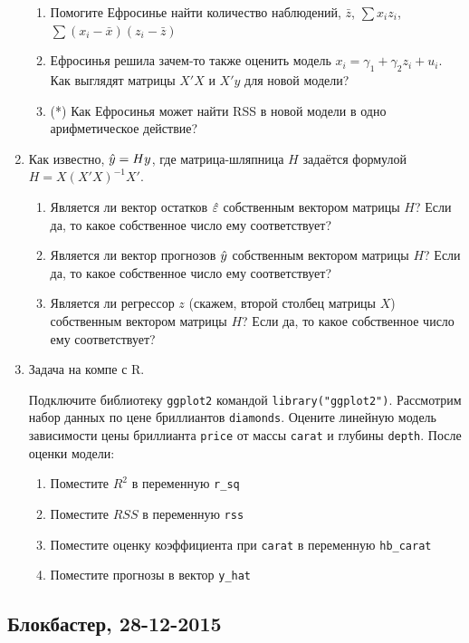 \documentclass[12pt, a4paper]{article}\usepackage[]{graphicx}\usepackage[]{color}
\begin{document}
\begin{enumerate}
\begin{enumerate}
\item Помогите Ефросинье найти количество наблюдений, $\bar{z}$, $\sum x_i z_i$, $\sum(x_i-\bar{x})(z_i-\bar{z})$
\item Ефросинья решила зачем-то также оценить модель $x_i = \gamma_1 + \gamma_2 z_i + u_i$. Как выглядят матрицы $X'X$ и $X'y$ для новой модели?
\item (*) Как Ефросинья может найти RSS в новой модели в одно арифметическое действие?
\end{enumerate}


\item Как известно, $\hat{y}=H y$, где матрица-шляпница $H$ задаётся формулой $H=X(X'X)^{-1}X'$.
\begin{enumerate}
\item Является ли вектор остатков $\hat{\varepsilon}$ собственным вектором матрицы $H$? Если да, то какое собственное число ему соответствует?
\item Является ли вектор прогнозов $\hat{y}$ собственным вектором матрицы $H$? Если да, то какое собственное число ему соответствует?
\item  Является ли регрессор $z$ (скажем, второй столбец матрицы $X$) собственным вектором матрицы $H$? Если да, то какое собственное число ему соответствует?
\end{enumerate}

\item Задача на компе с R.

Подключите библиотеку \verb|ggplot2| командой \verb|library("ggplot2")|. Рассмотрим набор данных по цене бриллиантов \verb|diamonds|. Оцените линейную модель зависимости цены бриллианта \verb|price| от массы \verb|carat| и глубины \verb|depth|. После оценки модели:
\begin{enumerate}
\item Поместите $R^2$ в переменную \verb|r_sq|
\item Поместите $RSS$ в переменную \verb|rss|
\item Поместите оценку коэффициента при \verb|carat| в переменную \verb|hb_carat|
\item Поместите прогнозы в вектор \verb|y_hat|
\end{enumerate}

\end{enumerate}


\subsection{Блокбастер, 28-12-2015}
\end{document}
